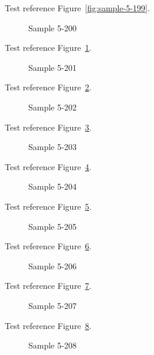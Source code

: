 Test reference Figure~\ref{fig:sample-5-199}.

\begin{figure}[tbhp]
\caption{Sample 5-200}
\label{fig:sample-5-200}
\end{figure}

Test reference Figure~\ref{fig:sample-5-200}.

\begin{figure}[tbhp]
\caption{Sample 5-201}
\label{fig:sample-5-201}
\end{figure}

Test reference Figure~\ref{fig:sample-5-201}.

\begin{figure}[tbhp]
\caption{Sample 5-202}
\label{fig:sample-5-202}
\end{figure}

Test reference Figure~\ref{fig:sample-5-202}.

\begin{figure}[tbhp]
\caption{Sample 5-203}
\label{fig:sample-5-203}
\end{figure}

Test reference Figure~\ref{fig:sample-5-203}.

\begin{figure}[tbhp]
\caption{Sample 5-204}
\label{fig:sample-5-204}
\end{figure}

Test reference Figure~\ref{fig:sample-5-204}.

\begin{figure}[tbhp]
\caption{Sample 5-205}
\label{fig:sample-5-205}
\end{figure}

Test reference Figure~\ref{fig:sample-5-205}.

\begin{figure}[tbhp]
\caption{Sample 5-206}
\label{fig:sample-5-206}
\end{figure}

Test reference Figure~\ref{fig:sample-5-206}.

\begin{figure}[tbhp]
\caption{Sample 5-207}
\label{fig:sample-5-207}
\end{figure}

Test reference Figure~\ref{fig:sample-5-207}.

\begin{figure}[tbhp]
\caption{Sample 5-208}
\label{fig:sample-5-208}
\end{figure}

